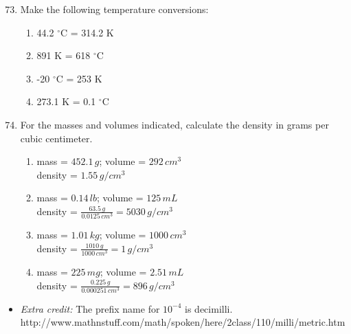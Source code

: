 \documentclass[12pt,letterpaper]{article}
\begin{document}
\begin{enumerate}
\setcounter{enumi}{72} %
\item 

Make the following temperature conversions: \\

\begin{enumerate}
\item 44.2 $^\circ$C = 314.2 K \\
\item 891 K =  618 $^\circ$C\\
\item -20 $^\circ$C = 253 K \\
\item 273.1 K = 0.1 $^\circ$C
\end{enumerate}

\pagebreak

\setcounter{enumi}{86} %
\item 

For the masses and volumes indicated, calculate the density in grams per cubic centimeter. \\

\begin{enumerate}

\item mass = $452.1 \, g$; volume = $292 \, cm^3$ \\
density = $1.55\,g/cm^3$ \\

\item mass = $0.14 \, lb$; volume = $125 \, mL$ \\
density = $\frac{63.5\,g}{0.0125\,cm^3} = 5030 \,g/cm^3$ \\

\item mass = $1.01 \, kg$; volume = $1000 \, cm^3$ \\
density = $\frac{1010\,g}{1000\,cm^3} = 1 \,g/cm^3$ \\

\item mass = $225 \, mg$; volume = $2.51 \, mL$ \\
density = $\frac{0.225\,g}{0.000251\,cm^3} = 896 \,g/cm^3$

\end{enumerate}


\end{enumerate}

\begin{itemize}

\item \textit{Extra credit:} The prefix name for $10^{-4}$ is decimilli. \\
http://www.mathnstuff.com/math/spoken/here/2class/110/milli/metric.htm
\end{itemize}
\end{document}
